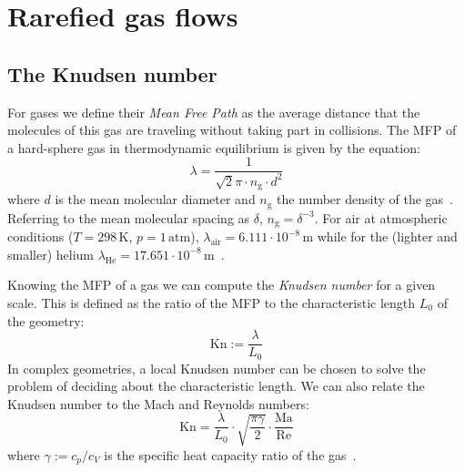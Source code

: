 \section{Rarefied gas flows}

\subsection{The Knudsen number}
For gases we define their \textit{Mean Free Path} as the average distance that 
the molecules of this gas are traveling without taking part in collisions.
The MFP of a hard-sphere gas in thermodynamic equilibrium is given by the equation:
\begin{equation}
 \lambda = \frac{1}{\sqrt{2} \pi \cdot n_\mathrm{g} \cdot d^2}
 \label{eq:MFP}
\end{equation}
where $d$ is the mean molecular diameter and $n_\mathrm{g}$ the number density of the gas~\cite{Zhang2012}.
Referring to the mean molecular spacing as $\delta$, $n_\mathrm{g}=\delta^{-3}$.
For air at atmospheric conditions ($T=298\,\mathrm{K}$, $p=1\,\mathrm{atm}$),
$\lambda_{\mathrm{air}} = 6.111\cdot10^{-8}\,\mathrm{m}$
while for the (lighter and smaller) helium 
$\lambda_{\mathrm{He}} = 17.651\cdot10^{-8}\,\mathrm{m}$~\cite{Karniadakis_Microflows}.

Knowing the MFP of a gas we can compute the \textit{Knudsen number} for a given scale.
This is defined as the ratio of the MFP to the characteristic length $L_0$ of the geometry:
\begin{equation}
 \mathrm{Kn} := \frac{\lambda}{L_0}
 \label{eq:Kn_def}
\end{equation}
In complex geometries, a local Knudsen number can be chosen to solve the problem
of deciding about the characteristic length.
We can also relate the Knudsen number to the Mach and Reynolds numbers:
\begin{equation}
 \mathrm{Kn} = \frac{\lambda}{L_0} \cdot \sqrt{\frac{\pi \gamma}{2}} \cdot \frac{\mathrm{Ma}}{\mathrm{Re}}
 \label{eq:Kn_Ma}
\end{equation}
where $\gamma := c_p / c_V$ is the specific heat capacity ratio of the gas~\cite{Zhang2012}.



